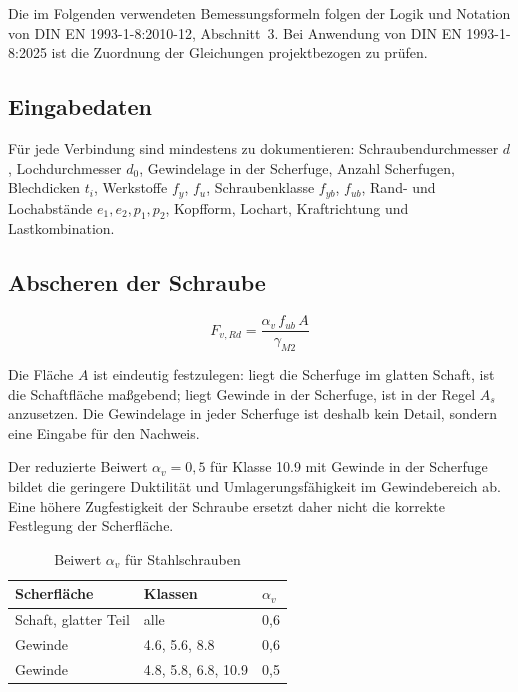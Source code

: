 \documentclass[10pt,a4paper]{article}
\begin{document}
\begin{hinweisbox}
Die im Folgenden verwendeten Bemessungsformeln folgen der Logik und Notation von DIN EN 1993-1-8:2010-12, Abschnitt~3. Bei Anwendung von DIN EN 1993-1-8:2025 ist die Zuordnung der Gleichungen projektbezogen zu prüfen.
\end{hinweisbox}

\subsection{Eingabedaten}
\begin{mindestbox}
Für jede Verbindung sind mindestens zu dokumentieren: Schraubendurchmesser $d$, Lochdurchmesser $d_0$, Gewindelage in der Scherfuge, Anzahl Scherfugen, Blechdicken $t_i$, Werkstoffe $f_y$, $f_u$, Schraubenklasse $f_{yb}$, $f_{ub}$, Rand- und Lochabstände $e_1,e_2,p_1,p_2$, Kopfform, Lochart, Kraftrichtung und Lastkombination.
\end{mindestbox}

\subsection{Abscheren der Schraube}
\begin{equation}
F_{v,Rd}=\frac{\alpha_v\, f_{ub}\, A}{\gamma_{M2}}
\end{equation}

\begin{hinweisbox}
Die Fläche $A$ ist eindeutig festzulegen: liegt die Scherfuge im glatten Schaft, ist die Schaftfläche maßgebend; liegt Gewinde in der Scherfuge, ist in der Regel $A_s$ anzusetzen. Die Gewindelage in jeder Scherfuge ist deshalb kein Detail, sondern eine Eingabe für den Nachweis.
\end{hinweisbox}

Der reduzierte Beiwert $\alpha_v=0{,}5$ für Klasse 10.9 mit Gewinde in der Scherfuge bildet die geringere Duktilität und Umlagerungsfähigkeit im Gewindebereich ab. Eine höhere Zugfestigkeit der Schraube ersetzt daher nicht die korrekte Festlegung der Scherfläche.


\begin{table}[H]
\centering
\caption{Beiwert $\alpha_v$ für Stahlschrauben}
\begin{tabular}{@{}lll@{}}
\toprule
\textbf{Scherfläche} & \textbf{Klassen} & $\alpha_v$ \\
\midrule
Schaft, glatter Teil & alle & 0,6 \\
Gewinde & 4.6, 5.6, 8.8 & 0,6 \\
Gewinde & 4.8, 5.8, 6.8, 10.9 & 0,5 \\
\bottomrule
\end{tabular}
\end{table}
\end{document}
